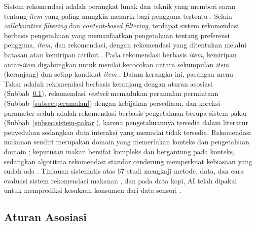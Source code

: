 Sistem rekomendasi adalah perangkat lunak dan teknik yang memberi saran tentang \textit{item} yang paling mungkin menarik bagi pengguna tertentu \citep*{ricci2021recommender}. Selain \textit{collaborative filtering} dan \textit{content-based filtering}, terdapat sistem rekomendasi berbasis pengetahuan yang memanfaatkan pengetahuan tentang preferensi pengguna, \textit{item}, dan rekomendasi, dengan rekomendasi yang ditentukan melalui batasan atau kemiripan atribut \citep{uta2024knowledgebased}. Pada rekomendasi berbasis \textit{item}, kemiripan antar-\textit{item} digabungkan untuk menilai kecocokan antara sekumpulan \textit{item} (keranjang) dan setiap kandidat \textit{item} \citep*{deshpande2004itembased}. Dalam kerangka ini, pasangan menu Takar adalah rekomendasi berbasis keranjang dengan aturan asosiasi (Subbab~\ref{subsec:aturan-asosiasi}), rekomendasi \textit{restock} memadukan peramalan permintaan (Subbab~\ref{subsec:peramalan}) dengan kebijakan persediaan, dan koreksi parameter seduh adalah rekomendasi berbasis pengetahuan berupa sistem pakar (Subbab~\ref{subsec:sistem-pakar}), karena pengetahuannya tersedia dalam literatur penyeduhan sedangkan data interaksi yang memadai tidak tersedia. Rekomendasi makanan sendiri merupakan domain yang memerlukan konteks dan pengetahuan domain \citep*{min2020food}; keputusan makan bersifat kompleks dan bergantung pada konteks, sedangkan algoritma rekomendasi standar cenderung memperkuat kebiasaan yang sudah ada \citep*{elsweiler2022food}. Tinjauan sistematis atas 67 studi mengkaji metode, data, dan cara evaluasi sistem rekomendasi makanan \citep*{bondevik2024systematic}, dan pada data kopi, AI telah dipakai untuk memprediksi kesukaan konsumen dari data sensori \citep*{gunning2026aidriven}.

\subsection{Aturan Asosiasi}
\label{subsec:aturan-asosiasi}

